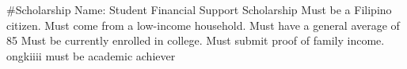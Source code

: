 #Scholarship Name: Student Financial Support Scholarship
Must be a Filipino citizen.
Must come from a low-income household.
Must have a general average of 85%
Must be currently enrolled in college.
Must submit proof of family income.
ongkiiii
must be academic achiever

